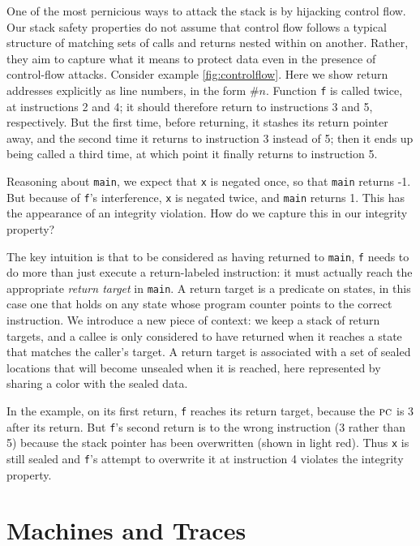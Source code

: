 \documentclass[acmsmall,review,anonymous]{acmart}\settopmatter{printfolios=true,printccs=false,printacmref=false}
\begin{document}
One of the most pernicious ways to attack the stack is by hijacking control flow.
Our stack safety properties do not assume that control flow follows a typical structure
of matching sets of calls and returns nested within on another.
Rather, they aim to capture what it means to protect data even in the presence of control-flow attacks.
Consider example \ref{fig:controlflow}.
Here we show return addresses explicitly as line numbers, in the form $\#n$.
Function {\tt f} is called twice, at instructions 2 and 4; it should therefore return to instructions
3 and 5, respectively. But the first time, before returning, it stashes its
return pointer away, and the second time it returns to instruction 3 instead of 5; then it ends
up being called a third time, at which point it finally returns to instruction 5.

Reasoning about {\tt main}, we expect that {\tt x} is negated once, so that {\tt main} returns
-1. But because of {\tt f}'s interference, {\tt x} is negated twice, and {\tt main} returns 1.
This has the appearance of an integrity violation.  How do we capture this in our
integrity property?

The key intuition is that to be considered as having returned to {\tt main}, {\tt f} needs
to do more than just execute a return-labeled instruction: it must actually reach the
appropriate {\em return target} in {\tt main}. A return target is a predicate on states,
in this case one that holds on any state whose program counter points to the correct instruction.
We introduce a new piece of context: we keep a stack of return targets, and a callee is
only considered to have returned when it reaches a state that matches the caller's target.
A return target is associated with a set of sealed locations that will become unsealed
when it is reached, here represented by sharing a color with the sealed data.

In the example, on its first return, {\tt f} reaches its return target, because the
\(\textsc{pc}\) is 3 after its return. But {\tt f}'s second return is to the wrong instruction
(3 rather than 5) because the stack pointer has been overwritten (shown in light red).
Thus {\tt x} is still sealed and {\tt f}'s attempt to overwrite it at instruction 4
violates the integrity property.

\section{Machines and Traces}
\label{sec:prelim}
\end{document}
